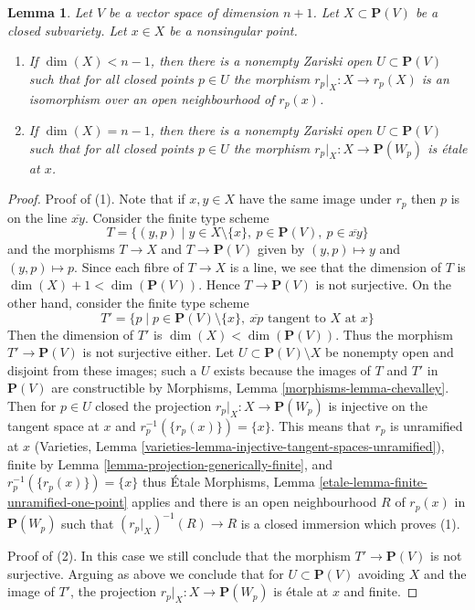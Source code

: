 \documentclass{stacks-project}
\theoremstyle{plain}
\newtheorem{lemma}[subsection]{Lemma}
\theoremstyle{definition}
\theoremstyle{remark}
\numberwithin{equation}{subsection}
\begin{document}
\begin{lemma}
\label{lemma-projection-generically-immersion}
Let $V$ be a vector space of dimension $n + 1$.
Let $X \subset \mathbf{P}(V)$ be a closed subvariety.
Let $x \in X$ be a nonsingular point.
\begin{enumerate}
\item If $\dim(X) < n - 1$, then there is a nonempty Zariski open
$U \subset \mathbf{P}(V)$ such that for all closed points $p \in U$ the
morphism $r_p|_X : X \to r_p(X)$ is an
isomorphism over an open neighbourhood of $r_p(x)$.
\item If $\dim(X) = n - 1$, then there is a nonempty Zariski open
$U \subset \mathbf{P}(V)$ such that for all closed points $p \in U$ the
morphism $r_p|_X : X \to \mathbf{P}(W_p)$ is \'etale at $x$.
\end{enumerate}
\end{lemma}

\begin{proof}
Proof of (1). Note that if $x, y \in X$ have the same image under
$r_p$ then $p$ is on the line $\overline{xy}$.
Consider the finite type scheme
$$
T = \{(y, p) \mid
y \in X \setminus \{x\},\ p \in \mathbf{P}(V),\ p \in \overline{xy}\}
$$
and the morphisms $T \to X$ and $T \to \mathbf{P}(V)$ given by
$(y, p) \mapsto y$ and $(y, p) \mapsto p$.
Since each fibre of $T \to X$ is a line, we see that
the dimension of $T$ is $\dim(X) + 1 < \dim(\mathbf{P}(V))$.
Hence $T \to \mathbf{P}(V)$ is not surjective. On the other hand,
consider the finite type scheme
$$
T' = \{p \mid
p \in \mathbf{P}(V) \setminus \{x\},
\ \overline{xp}\text{ tangent to }X\text{ at }x\}
$$
Then the dimension of $T'$ is $\dim(X) < \dim(\mathbf{P}(V))$.
Thus the morphism $T' \to \mathbf{P}(V)$ is not surjective either.
Let $U \subset \mathbf{P}(V) \setminus X$ be nonempty open and disjoint
from these images; such a $U$ exists because the images of $T$ and $T'$
in $\mathbf{P}(V)$ are constructible by
Morphisms, Lemma \ref{morphisms-lemma-chevalley}.
Then for $p \in U$ closed the projection
$r_p|_X : X \to \mathbf{P}(W_p)$ is injective on the
tangent space at $x$ and $r_p^{-1}(\{r_p(x)\}) = \{x\}$.
This means that $r_p$ is unramified at $x$
(Varieties, Lemma \ref{varieties-lemma-injective-tangent-spaces-unramified}),
finite by Lemma \ref{lemma-projection-generically-finite},
and $r_p^{-1}(\{r_p(x)\}) = \{x\}$ thus \'Etale Morphisms, Lemma
\ref{etale-lemma-finite-unramified-one-point} applies and
there is an open neighbourhood $R$ of $r_p(x)$
in $\mathbf{P}(W_p)$ such that $(r_p|_X)^{-1}(R) \to R$ is a
closed immersion which proves (1).

\medskip\noindent
Proof of (2). In this case we still conclude that the morphism
$T' \to \mathbf{P}(V)$ is not surjective.
Arguing as above we conclude that for $U \subset \mathbf{P}(V)$
avoiding $X$ and the image of $T'$, the projection
$r_p|_X : X \to \mathbf{P}(W_p)$ is \'etale at $x$ and finite.
\end{proof}
\end{document}
